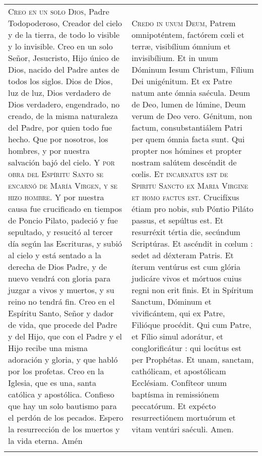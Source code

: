 \documentclass[./rosary.tex]{subfiles}
\begin{document}
\begin{longtable} { p{} p{} }
    \label{creed-nicene}
    \textsc{Creo en un solo Dios}, Padre Todopoderoso, Creador del cielo y de la tierra, de todo lo visible y lo invisible. 
    Creo en un solo Señor, Jesucristo, Hijo único de Dios, nacido del Padre antes de todos los siglos. Dios de Dios, luz de luz, 
    Dios verdadero de Dios verdadero, engendrado, no creado, de la misma naturaleza del Padre, por quien todo fue hecho. Que por nosotros, los hombres, 
    y por nuestra salvación bajó del cielo. \textsc{Y por obra del Espíritu Santo se encarnó de María Virgen, y se hizo hombre}. 
    Y por nuestra causa fue crucificado en tiempos de Poncio Pilato, padeció y fue sepultado, y resucitó al tercer día según las Escrituras, 
    y subió al cielo y está sentado a la derecha de Dios Padre, y de nuevo vendrá con gloria para juzgar a vivos y muertos, y su reino no tendrá fin. 
    Creo en el Espíritu Santo, Señor y dador de vida, que procede del Padre y del Hijo, que con el Padre y el Hijo recibe una misma adoración y gloria, 
    y que habló por los profetas. Creo en la Iglesia, que es una, santa católica y apostólica. Confieso que hay un solo bautismo para el perdón de los pecados. 
    Espero la resurrección de los muertos y la vida eterna. Amén
        &
    \textsc{Credo in unum Deum}, Patrem omnipoténtem, factórem cœli et terræ, visibílium ómnium et invisibílium.
    Et in unum Dóminum Iesum Christum, Fílium Dei unigénitum. Et ex Patre natum ante ómnia saécula. Deum de Deo, lumen de lúmine, Deum verum de Deo vero.
    Génitum, non factum, consubstantiálem Patri per quem ómnia facta sunt. Qui propter nos hómines et propter nostram salútem descéndit de cœlis.
    \textsc{Et incarnatus est de Spiritu Sancto ex Maria Virgine et homo factus est}. Crucifíxus étiam pro nobis, sub Póntio Piláto passus, et sepúltus est.
    Et resurréxit tértia die, secúndum Scriptúras. Et ascéndit in cœlum : sedet ad déxteram Patris. Et íterum ventúrus est cum glória judicáre vivos et mórtuos cuius regni non erit finis.
    Et in Spíritum Sanctum, Dóminum et vivificántem, qui ex Patre, Filióque procédit. Qui cum Patre, et Fílio simul adorátur, et conglorificátur : qui locútus est per Prophétas.
    Et unam, sanctam, cathólicam, et apostólicam Ecclésiam. Confíteor unum baptísma in remissiónem peccatórum. Et expécto resurrectiónem mortuórum et vitam ventúri saéculi. Amen.\\\\
\end{longtable}
\end{document}
